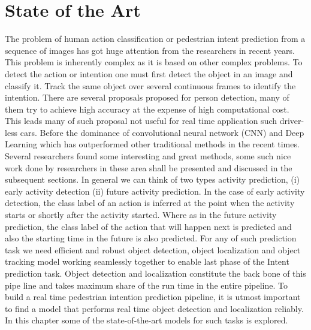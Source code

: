 \chapter{State of the Art}
The problem of human action classification or pedestrian intent prediction from a sequence of images has got huge attention from the researchers in recent years. This problem is inherently complex as it is based on other 
complex problems. To detect the action or intention one must first detect the object in an image and classify it. Track the same object over several continuous frames to identify the intention. There are several proposals proposed for person detection, many of them try to achieve high accuracy at the expense of high computational cost. This leads many of such proposal not useful for real time application such driver-less cars.   
Before the dominance of convolutional neural network (CNN) and Deep Learning which has outperformed other traditional methods in the recent times. Several researchers found some interesting and great methods, some such nice work done by researchers in these area shall be presented and discussed in the subsequent sections. In general we can think of two types activity prediction, (i) early activity detection (ii) future activity prediction. In the case of early activity detection, the class label of an action is inferred at the point when the activity starts or shortly after the activity started. Where as in the future activity prediction, the class label of the action that will happen next is predicted and also the starting time in the future is also predicted. For any of such prediction task we need efficient and robust object detection, object localization and object tracking model working seamlessly together to enable last phase of the Intent prediction task. Object detection and localization constitute the back bone of this pipe line and takes maximum share of the run time in the entire pipeline. To build a real time pedestrian intention prediction pipeline, it is utmost important to find a model that performs real time object detection and localization reliably. In this chapter some of the state-of-the-art models for such tasks is explored.

